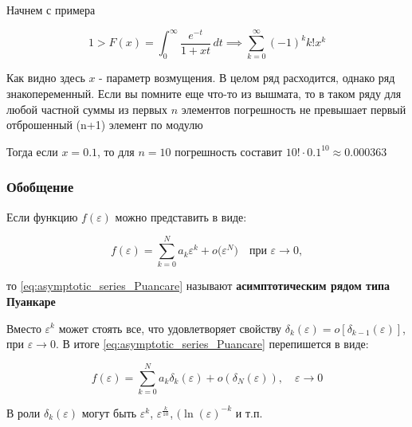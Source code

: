 	Начнем с примера
	
	\begin{equation}
		1 > F(x) = \int_0^\infty \frac{e^{-t}}{1 + xt} \, dt \implies \sum_{k=0}^\infty (-1)^k k! x^k
	\end{equation}
	
	Как видно здесь $x$ - параметр возмущения. В целом ряд расходится, однако ряд знакопеременный. Если вы помните еще что-то из вышмата, то в таком ряду для любой частной суммы из первых $n$ элементов погрешность не превышает первый отброшенный (n+1) элемент по модулю
	
	Тогда если $x = 0.1$, то для $n=10$ погрешность составит $10!\cdot0.1^{10} \approx 0.000363$
	
	\subsubsection{Обобщение}
	
	Если функцию $f(\varepsilon)$ можно представить в виде:
	
	\begin{equation}
		f(\varepsilon) = \sum_{k=0}^N a_k \varepsilon^k + o\bigl(\varepsilon^N\bigr) \quad \text{при } \varepsilon \to 0,
		\label{eq:asymptotic_series_Puancare}
	\end{equation}
	
	то \eqref{eq:asymptotic_series_Puancare} называют \textbf{асимптотическим рядом типа Пуанкаре}
	
	\vspace{1em}
	
	Вместо $\varepsilon^k$ может стоять все, что удовлетворяет свойству $\delta_k(\varepsilon) = o\left[\delta_{k-1}(\varepsilon)\right]$, при $\varepsilon \to 0$. В итоге \eqref{eq:asymptotic_series_Puancare} перепишется в виде:
	
	\begin{equation}
		f(\varepsilon) = \sum_{k=0}^{N} a_k \delta_k(\varepsilon) + o(\delta_N(\varepsilon)), \quad \varepsilon \to 0
	\end{equation}
	
	В роли $\delta_k(\varepsilon)$ могут быть $\varepsilon^k$, $\varepsilon^{\frac k {10}}$, $(\ln(\varepsilon)^{-k}$ и т.п.
	
	\newpage
	
	
